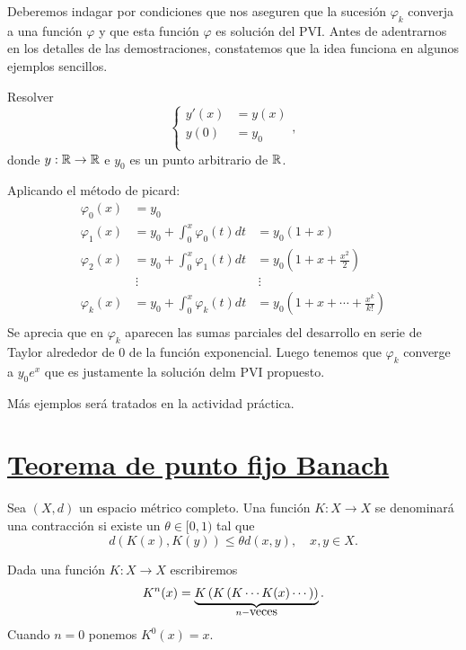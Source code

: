 Deberemos indagar por condiciones que nos aseguren que la sucesión $\varphi_k$ converja a una función $\varphi$ y que esta función $\varphi$ es solución del PVI. Antes de adentrarnos en los detalles de las demostraciones, constatemos que la idea funciona en algunos ejemplos sencillos.

\begin{ejemplo}{} Resolver
\[
 \left\{
 \begin{array}{ll}
 y'(x)&=y(x)\\
 y(0)&=y_0\\
 \end{array}
  \right. ,
\]
donde $y:\mathbb{R}\to\mathbb{R}$ e $y_0$ es un punto arbitrario de $\mathbb{R}$.

Aplicando el método de picard:
\[
 \begin{array}{lll}
  \varphi_0(x)&=y_0 &\\
  \varphi_1(x) &= y_0+\int_{0}^x \varphi_0(t)dt &= y_0(1+x)\\
  \varphi_2(x) &= y_0+\int_{0}^x \varphi_1(t)dt &= y_0(1+x+\frac{x^2}{2})\\
               &\,\vdots                        &\,\vdots                 \\
  \varphi_k(x) &= y_0+\int_{0}^x \varphi_k(t)dt &= y_0(1+x+\cdots+\frac{x^k}{k!})\\
 \end{array}
\]
Se aprecia que en $\varphi_k$ aparecen las sumas parciales del desarrollo en serie de Taylor alrededor de $0$ de la función exponencial. Luego tenemos que $\varphi_k$ converge a $y_0e^x$ que es justamente la solución delm PVI propuesto.
\end{ejemplo}

Más ejemplos será tratados en la actividad práctica.

\section{\href{https://es.wikipedia.org/wiki/Teorema_del_punto_fijo_de_Banach}{Teorema de punto fijo Banach}}

\begin{definicion} Sea $(X,d)$ un espacio métrico completo. Una función $K:X\to X$ se denominará una contracción si existe un $\theta\in [0,1)$ tal que
\[d(K(x),K(y))\leq \theta d(x,y),\quad x,y\in X.\]
\end{definicion}

Dada una función $K:X\to X$ escribiremos
\[K^n(x)=\underbrace{K\left( K \left( K\cdots K(x)\cdots \right)\right)}_{n-\hbox{veces}}.\]
Cuando $n=0$ ponemos $K^0(x)=x$.

